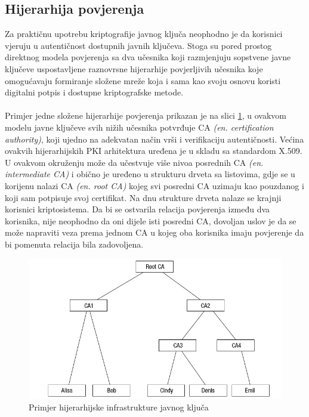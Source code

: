 \subsection{Hijerarhija povjerenja}
Za praktičnu upotrebu kriptografije javnog ključa neophodno je da korisnici vjeruju u autentičnost dostupnih javnih ključeva. Stoga su pored prostog direktnog modela povjerenja sa dva učesnika koji razmjenjuju sopstvene javne ključeve uspostavljene raznovrsne hijerarhije povjerljivih učesnika koje omogućavaju formiranje složene mreže koja i sama kao svoju osnovu koristi digitalni potpis i dostupne kriptografske metode.

\paragraph*{}
Primjer jedne složene hijerarhije povjerenja prikazan je na slici \ref{fig:pki}, u ovakvom modelu javne ključeve svih nižih učesnika potvrđuje CA \textit{(en. certification authority)}, koji ujedno na adekvatan način vrši i verifikaciju autentičnosti. Većina ovakvih hijerarhijskih PKI arhitektura uređena je u skladu sa standardom X.509. U ovakvom okruženju može da učestvuje više nivoa posrednih CA \textit{(en. intermediate CA)} i obično je uređeno u strukturu drveta sa listovima, gdje se u korijenu nalazi CA \textit{(en. root CA)} kojeg svi posredni CA uzimaju kao pouzdanog i koji sam potpisuje svoj certifikat. Na dnu strukture drveta nalaze se krajnji korisnici kriptosistema. Da bi se ostvarila relacija povjerenja između dva korisnika, nije neophodno da oni dijele isti posredni CA, dovoljan uslov je da se može napraviti veza prema jednom CA u kojeg oba korisnika imaju povjerenje da bi pomenuta relacija bila zadovoljena.

\begin{figure}[H]
    \centering
    \includegraphics[width=1.0\textwidth]{material/pki}
    \caption{Primjer hijerarhijske infrastrukture javnog ključa}
    \label{fig:pki}
\end{figure}

